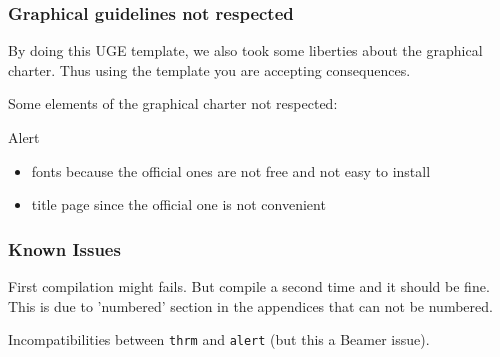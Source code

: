 	\begin{frame}
		\frametitle{Graphical guidelines not respected}

		By doing this UGE template, we also took some liberties about the graphical charter.
		Thus using the template you are accepting consequences.
		\bigskip
		
		Some elements of the graphical charter not respected:
		\begin{alertblock}{Alert}
			\begin{itemize}
			 	\item fonts because the official ones are not free and not easy to install
			 	\item title page since the official one is not convenient
			\end{itemize}
	   \end{alertblock}
	\end{frame}

	\begin{frame}[fragile]
		\frametitle{Known Issues}

		First compilation might fails.
		But compile a second time and it should be fine.
		This is due to 'numbered' section in the appendices that can not be numbered.

		Incompatibilities between \verb|thrm| and \verb|alert| (but this a Beamer issue).
	\end{frame}
